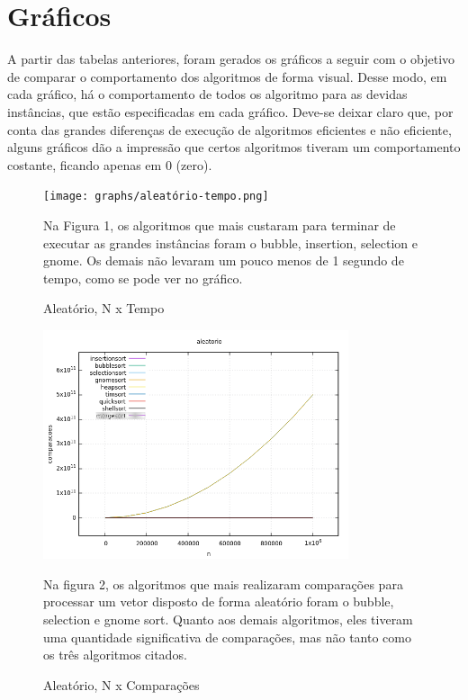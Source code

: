 \documentclass[report]{uftex}
\begin{document}
\section{Gráficos}
A partir das tabelas anteriores, foram gerados os gráficos a seguir com o objetivo de comparar o comportamento dos algoritmos de forma visual. Desse modo, em cada gráfico, há o comportamento de todos os algoritmo para as devidas instâncias, que estão especificadas em cada gráfico. Deve-se deixar claro que, por conta das grandes diferenças de execução de algoritmos eficientes e não eficiente, alguns gráficos dão a impressão que certos algoritmos tiveram um comportamento costante, ficando apenas em 0 (zero).

\begin{figure}[h]
\centering
\caption{Aleatório, N x Tempo}
\texttt{[image: graphs/aleatório-tempo.png]}

Na Figura 1, os algoritmos que mais custaram para terminar de executar as grandes instâncias foram o bubble, insertion, selection e gnome. Os demais não levaram um pouco menos de 1 segundo de tempo, como se pode ver no gráfico.
\end{figure}


\begin{figure}[h]
\centering
\caption{Aleatório, N x Comparações}
\includegraphics[width=0.8\textwidth]{graphs/aleatório-comparações.png}

Na figura 2, os algoritmos que mais realizaram comparações para processar um vetor disposto de forma aleatório foram o bubble, selection e gnome sort. Quanto aos demais algoritmos, eles tiveram uma quantidade significativa de comparações, mas não tanto como os três algoritmos citados.
\end{figure}
\end{document}
